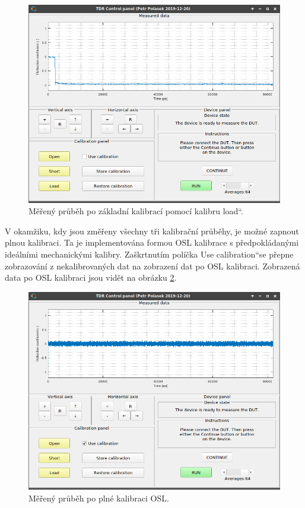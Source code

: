 \begin{figure}[htbp]
\includegraphics[width=\textwidth,keepaspectratio]{images/gui/calibrations_performed.png}\caption{Měřený průběh po základní kalibrací pomocí kalibru \quotedblbase load\textquotedblleft .}\label{calibrations_performed}
\end{figure}

V okamžiku, kdy jsou změřeny všechny tři kalibrační průběhy, je možné zapnout plnou kalibraci. Ta je implementována formou OSL kalibrace \cite{VNAcalibrationarticle} s předpokládanými ideálními mechanickými kalibry. Zaškrtnutím políčka \quotedblbase Use calibration\textquotedblleft se přepne zobrazování z nekalibrovaných dat na zobrazení dat po OSL kalibraci. Zobrazená data po \acrshort{OSL} kalibraci jsou vidět na obrázku \ref{calibration_applied_on_new_short}.

\begin{figure}[htbp]
\includegraphics[width=\textwidth,keepaspectratio]{images/gui/calibration_applied_on_new_short.png}\caption{Měřený průběh po plné kalibraci OSL.}\label{calibration_applied_on_new_short}
\end{figure}